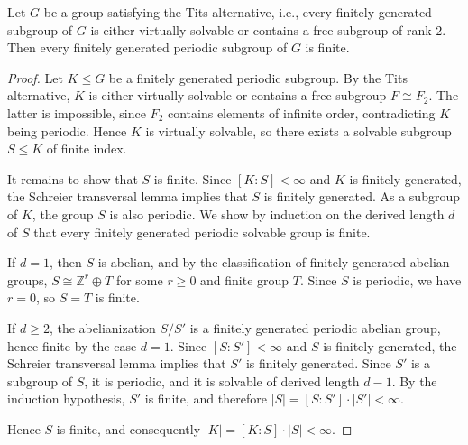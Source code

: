 \documentclass[10pt,a4paper]{amsart}
\begin{document}
\begin{lemma} \label{lem:tits}
Let $G$ be a group satisfying the Tits alternative, i.e., every finitely generated subgroup of $G$ is either virtually solvable or contains a free subgroup of rank $2$. 
Then every finitely generated periodic subgroup of $G$ is finite.
\end{lemma}

\begin{proof}
Let $K \leq G$ be a finitely generated periodic subgroup.
By the Tits alternative, $K$ is either virtually solvable or contains a free subgroup $F \cong F_2$.
The latter is impossible, since $F_2$ contains elements of infinite order, contradicting $K$ being periodic.
Hence $K$ is virtually solvable, so there exists a solvable subgroup $S \leq K$ of finite index.

It remains to show that $S$ is finite.
Since $[K:S] < \infty$ and $K$ is finitely generated, the Schreier transversal lemma implies that $S$ is finitely generated.
As a subgroup of $K$, the group $S$ is also periodic.
We show by induction on the derived length $d$ of $S$ that every finitely generated periodic solvable group is finite.

If $d = 1$, then $S$ is abelian, and by the classification of finitely generated abelian groups, $S \cong \mathbb{Z}^r \oplus T$ for some $r \geq 0$ and finite group $T$.
Since $S$ is periodic, we have $r = 0$, so $S = T$ is finite.

If $d \geq 2$, the abelianization $S/S'$ is a finitely generated periodic abelian group, hence finite by the case $d=1$.
Since $[S:S'] < \infty$ and $S$ is finitely generated, the Schreier transversal lemma implies that $S'$ is finitely generated.
Since $S'$ is a subgroup of $S$, it is periodic, and it is solvable of derived length $d-1$.
By the induction hypothesis, $S'$ is finite, and therefore $|S| = [S:S'] \cdot |S'| < \infty$.

Hence $S$ is finite, and consequently $|K| = [K:S] \cdot |S| < \infty$.
\end{proof}
\end{document}
